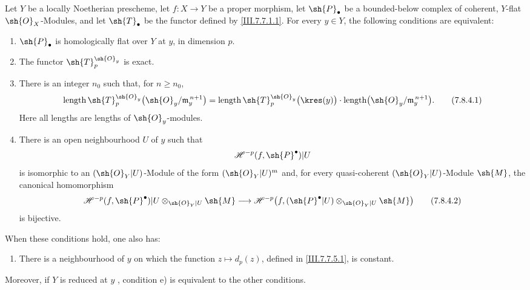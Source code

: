 \begin{proposition}[7.8.4]
\label{III.7.8.4}
Let $Y$ be a locally Noetherian prescheme, let
$f:X\to Y$ be a proper morphism, let $\sh{P}_\bullet$ be a
bounded-below complex of coherent, $Y$-flat
$\sh{O}_X$-Modules, and let $\sh{T}_\bullet$ be the functor
defined by \eqref{III.7.7.1.1}.  For every $y\in Y$, the
following conditions are equivalent:
\begin{enumerate}
  \item[a)] $\sh{P}_\bullet$ is homologically flat over $Y$
  at $y$, in dimension $p$.
  \item[b)] The functor $\sh{T}_p^{\sh{O}_y}$ is exact.
  \item[c)] There is an integer $n_0$ such that, for
  $n\geq n_0$,
  \[
    \operatorname{length}
      \sh{T}_p^{\sh{O}_y}
        \bigl(\sh{O}_y/\mathfrak m_y^{\,n+1}\bigr)
    =
    \operatorname{length}
      \sh{T}_p^{\sh{O}_y}\bigl(\kres(y)\bigr)
    \cdot
    \operatorname{length}
      \bigl(\sh{O}_y/\mathfrak m_y^{\,n+1}\bigr).
    \tag{7.8.4.1}\label{III.7.8.4.1}
  \]
  Here all lengths are lengths of $\sh{O}_y$-modules.
  \item[d)] There is an open neighbourhood $U$ of $y$ such
  that
  \[
    \mathscr{H}^{-p}(f,\sh{P}^\bullet)|U
  \]
  is isomorphic to an $(\sh{O}_Y|U)$-Module of the form
  $(\sh{O}_Y|U)^m$ and, for every quasi-coherent
  $(\sh{O}_Y|U)$-Module $\sh{M}$, the canonical
  homomorphism
  \[
    \mathscr{H}^{-p}(f,\sh{P}^\bullet)|U
      \otimes_{\sh{O}_Y|U}\sh{M}
    \longrightarrow
    \mathscr{H}^{-p}
      \bigl(f,(\sh{P}^\bullet|U)
        \otimes_{\sh{O}_Y|U}\sh{M}\bigr)
    \tag{7.8.4.2}\label{III.7.8.4.2}
  \]
  is bijective.
\end{enumerate}
When these conditions hold, one also has:
\begin{enumerate}
  \item[e)] There is a neighbourhood of $y$ on which the
  function $z\mapsto d_p(z)$, defined in
  \eqref{III.7.7.5.1}, is constant.
\end{enumerate}
Moreover, if $Y$ is reduced at $y$ ,
condition e) is equivalent to the other conditions.
\end{proposition}

